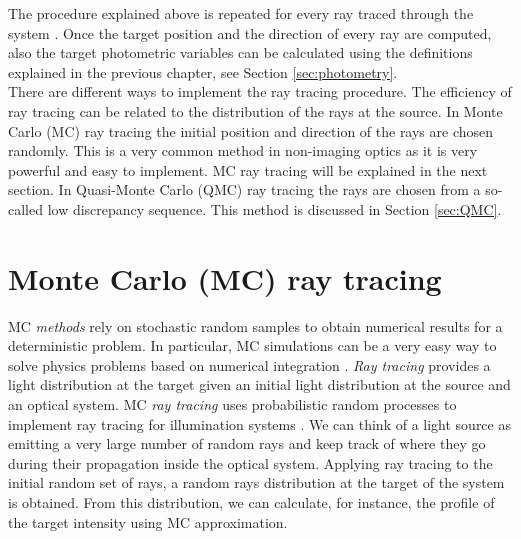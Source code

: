 The procedure explained above is repeated for every ray traced through the system \cite{Gross2005Handbook}. 
Once the target position and the direction of every ray are computed, also the target photometric variables can be calculated using the definitions explained in the previous chapter, see Section \ref{sec:photometry}.
\\ \indent
There are different ways to implement the ray tracing procedure. The efficiency of ray tracing can be related to the distribution of the rays at the source. 
In Monte Carlo (MC) ray tracing the initial position and direction of the rays are chosen randomly. This is a very common method in non-imaging optics as it is very powerful and easy to implement. MC ray tracing will be explained in the next section.
In Quasi-Monte Carlo (QMC) ray tracing the rays are chosen from a so-called low discrepancy sequence. This method is discussed in Section \ref{sec:QMC}.
\section{Monte Carlo (MC) ray tracing}
MC \textit{methods} rely on stochastic random samples to obtain numerical results for a deterministic problem. In particular, MC simulations can be a very easy way to solve physics problems based on numerical integration \cite{jensen2003monte}. \textit{Ray tracing} provides a light distribution at the target given an initial light distribution at the source and an optical system.
MC \textit{ray tracing} uses probabilistic random processes to implement ray tracing for illumination systems \cite{leobacher2014introduction}.
We can think of a light source as emitting a very large number of random rays and keep track of where they go during their propagation inside the optical system. 
Applying ray tracing to the initial random set of rays, a random rays distribution at the target of the system is obtained. From this distribution, we can calculate, for instance, the profile of the target intensity using MC approximation.  

